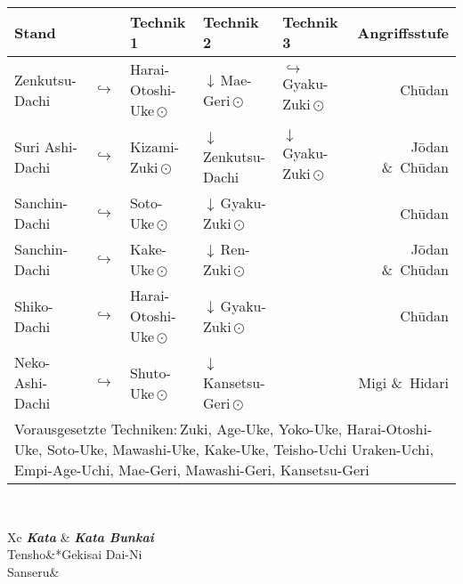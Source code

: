 \begin{tcolorbox}[colframe=BRBELT,colback=white,coltitle=white,title=2. Kyu:\indent Kihon-Ido Kata - Partnerformen - Erwartungshorizont]	
\null\vfill\null
{}
	\begin{tabularx}{\textwidth}{llllXr}
		\textbf{Stand} 	&  	& \textbf{Technik 1} & \textbf{Technik 2} 				& \textbf{Technik 3}& \textbf{Angriffsstufe}\\
		\midrule
		Zenkutsu-Dachi 	& \(\hookrightarrow\)	& Harai-Otoshi-Uke\,\(\odot\) 	& \(\downarrow\)\,Mae-Geri\,\(\odot\)	& \(\hookrightarrow\) 	 Gyaku-Zuki\,\(\odot\)	& Ch\={u}dan \\
		Suri Ashi-Dachi	& \(\hookrightarrow\)	& Kizami-Zuki\,\(\odot\)		& \(\downarrow\)\,Zenkutsu-Dachi & \(\downarrow\)	 Gyaku-Zuki\,\(\odot\)	& J\={o}dan \&~Ch\={u}dan \\
		Sanchin-Dachi 	& \(\hookrightarrow\)	& Soto-Uke\,\(\odot\) 			& \(\downarrow\)\,Gyaku-Zuki\,\(\odot\) 				&						&	 					 Ch\={u}dan \\
		Sanchin-Dachi 	& \(\hookrightarrow\)	& Kake-Uke\,\(\odot\) 			& \(\downarrow\)\,Ren-Zuki\,\(\odot\) 					&						& 						 J\={o}dan \&~Ch\={u}dan \\
		Shiko-Dachi 	& \(\hookrightarrow\)	& Harai-Otoshi-Uke\,\(\odot\) 	& \(\downarrow\)\,Gyaku-Zuki\,\(\odot\) 				&						& 						 Ch\={u}dan \\
		Neko-Ashi-Dachi	& \(\hookrightarrow\)	& Shuto-Uke\,\(\odot\) 			& \(\downarrow\)\,Kansetsu-Geri\,\(\odot\) 					&						& 						 Migi \&~Hidari  \\
		\midrule
		\multicolumn{6}{p{\linewidth-2\tabcolsep}}{{\footnotesize Vorausgesetzte Techniken:\,Zuki, Age-Uke, Yoko-Uke, Harai-Otoshi-Uke, Soto-Uke, Mawashi-Uke, Kake-Uke, Teisho-Uchi Uraken-Uchi, Empi-Age-Uchi, Mae-Geri, Mawashi-Geri, Kansetsu-Geri}}\\
		\midrule
	\end{tabularx}\\
	\null\vfill\null
	\begin{minipage}[t]{0.45\textwidth}
		\begin{tabularx}{\textwidth}{Xc}
			\midrule
			\textbf{\textit{Kata}} & \textbf{\textit{Kata Bunkai}} \\
			Tensho&*{Gekisai Dai-Ni}\\
			Sanseru& \\
			\midrule
		\end{tabularx}
	\end{minipage}
	\null\hfill\null

\end{tcolorbox}
